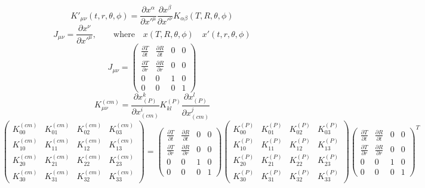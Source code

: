 \documentclass[10pt,letterpaper]{article}
\begin{document}
\begin{equation}
K'_{\mu\nu}(t,r,\theta,\phi) = \frac{\partial x^\alpha}{\partial x'^\mu}\frac{\partial x^\beta}{\partial x'^\nu} K_{\alpha\beta}(T,R,\theta,\phi)
\end{equation}
\begin{equation}
J_{\mu\nu} = \frac{\partial x^\nu}{\partial x'^\mu},\qquad\text{where}\quad x(T,R,\theta,\phi)\quad x'(t,r,\theta,\phi)
\end{equation}
\begin{equation}
\renewcommand*{\arraystretch}{1.5}
J_{\mu\nu} = 
\begin{pmatrix}
\frac{\partial T}{\partial t}&\frac{\partial R}{\partial t}&0&0\\
\frac{\partial T}{\partial r}&\frac{\partial R}{\partial r}&0&0\\
0&0&1&0\\
0&0&0&1
\end{pmatrix}
\end{equation}
\begin{equation}
K^{(cm)}_{\mu\nu} = \frac{\partial x_{(P)}^k}{\partial x_{(cm)}^i}K^{(P)}_{kl}\frac{\partial x_{(P)}^l}{\partial x_{(cm)}^j}
\end{equation}
\begin{equation}
\renewcommand*{\arraystretch}{1.5}
\begin{pmatrix}
K^{(cm)}_{00}&K^{(cm)}_{01}&K^{(cm)}_{02}&K^{(cm)}_{03}\\
K^{(cm)}_{10}&K^{(cm)}_{11}&K^{(cm)}_{12}&K^{(cm)}_{13}\\
K^{(cm)}_{20}&K^{(cm)}_{21}&K^{(cm)}_{22}&K^{(cm)}_{23}\\
K^{(cm)}_{30}&K^{(cm)}_{31}&K^{(cm)}_{32}&K^{(cm)}_{33} \end{pmatrix}
=
\begin{pmatrix}
\frac{\partial T}{\partial t}&\frac{\partial R}{\partial t}&0&0\\
\frac{\partial T}{\partial r}&\frac{\partial R}{\partial r}&0&0\\
0&0&1&0\\
0&0&0&1
\end{pmatrix}
\begin{pmatrix}
K^{(P)}_{00}&K^{(P)}_{01}&K^{(P)}_{02}&K^{(P)}_{03}\\
K^{(P)}_{10}&K^{(P)}_{11}&K^{(P)}_{12}&K^{(P)}_{13}\\
K^{(P)}_{20}&K^{(P)}_{21}&K^{(P)}_{22}&K^{(P)}_{23}\\
K^{(P)}_{30}&K^{(P)}_{31}&K^{(P)}_{32}&K^{(P)}_{33} 
\end{pmatrix}
\begin{pmatrix}
\frac{\partial T}{\partial t}&\frac{\partial R}{\partial t}&0&0\\
\frac{\partial T}{\partial r}&\frac{\partial R}{\partial r}&0&0\\
0&0&1&0\\
0&0&0&1
\end{pmatrix}^T
\end{equation}
\end{document}
